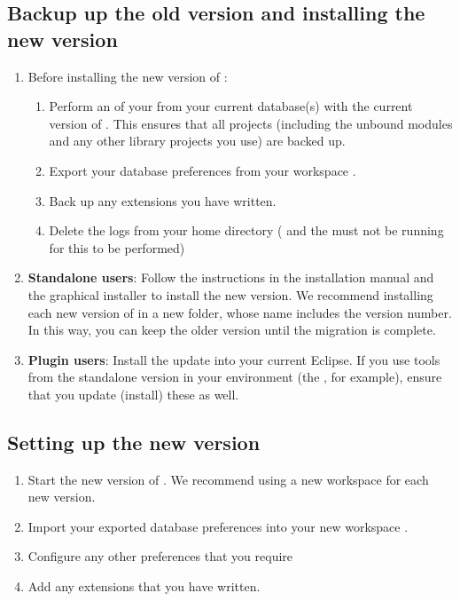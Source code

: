 \subsection{Backup up the old version and installing the new version}
\begin{enumerate}
\item Before installing the new version of \app{}:
\begin{enumerate}
\item Perform an  of your \gdprojects{} from your current database(s) with the current version of \app{} . This ensures that all projects (including the unbound modules and any other library projects you use) are backed up.
\item Export your database preferences from your workspace .
\item Back up any extensions you have written.
\item Delete the logs from your home directory (\app{} and the \gdagent{} must not be running for this to be performed)
\end{enumerate}
\item \textbf{Standalone users}: Follow the instructions in the installation manual and the graphical installer to install the new version. We recommend installing each new version of \app{} in a new folder, whose name includes the version number. In this way, you can keep the older version until the migration is complete. 
\item \textbf{Plugin users}: Install the update into your current Eclipse. If you use tools from the standalone version in your environment (the \gdagent{}, for example), ensure that you update (install) these as well. 
\end{enumerate}

\subsection{Setting up the new version}
\begin{enumerate}
\item Start the new version of \app{}. We recommend using a new workspace for each new version. 
\item Import your exported database preferences into your new workspace  .
\item Configure any other preferences that you require
\item Add any extensions that you have written. 
\end{enumerate}

